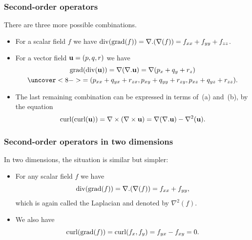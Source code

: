 \documentclass[9pt]{beamer}
\begin{document}
\begin{frame}[t]
 \frametitle{Second-order operators}
 There are three more possible combinations.
 \begin{itemize}
  \item<2->[(a)] For a scalar field $f$ we have
   $\operatorname{div}(\operatorname{grad}(f)) = \nabla.(\nabla(f)) = f_{xx}+f_{yy}+f_{zz}$.\\
  \item<7->[(b)] For a vector field $\mathbf{u}=(p,q,r)$ we have
   \begin{multline*}
     \grad(\dv(\vu)) = \nabla(\nabla.\vu) = \nabla(p_x+q_y+r_z)\\ \uc<8->{= 
       (p_{xx}+q_{yx}+r_{zx},
        p_{xy}+q_{yy}+r_{zy},
        p_{xz}+q_{yz}+r_{zz}).}
   \end{multline*}
  \item<9->[(c)] The last remaining combination can be expressed in terms
   of~(a) and~(b), by the equation 
   \[ \operatorname{curl}(\operatorname{curl}(\mathbf{u})) = \nabla\times(\nabla\times\mathbf{u}) = 
       \nabla(\nabla.\mathbf{u}) - \nabla^2(\mathbf{u}).
   \]
 \end{itemize}
\end{frame}

\begin{frame}[t]
 \frametitle{Second-order operators in two dimensions}

 In two dimensions, the situation is similar but simpler:
 \begin{itemize}
  \item<2->[(a)] For any scalar field $f$ we have 
   \[ \operatorname{div}(\operatorname{grad}(f))=\nabla.(\nabla(f))= f_{xx}+f_{yy}, \]
   which is again called the Laplacian and denoted by $\nabla^2(f)$.
  \item<3->[(b)] We also have 
   \[ \operatorname{curl}(\operatorname{grad}(f)) = \operatorname{curl}(f_x,f_y) = f_{yx}-f_{xy} = 0. \]
 \end{itemize}
\end{frame}
\end{document}
